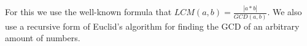 \documentclass{article}
\begin{document}
For this we use the well-known formula that $LCM(a,b)=\frac{|a*b|}{GCD(a,b)}$. We also use a recursive form of Euclid's algorithm for finding the GCD of an arbitrary amount of numbers.
\end{document}
